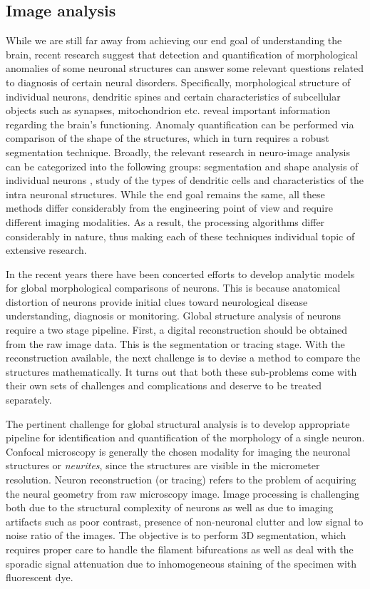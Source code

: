 \subsection{Image analysis}
While we are still far away from achieving our end goal of understanding the brain, recent research suggest that detection and quantification of morphological anomalies of some neuronal structures can answer some relevant questions related to diagnosis of certain neural disorders. Specifically, morphological structure of individual neurons, dendritic spines and certain characteristics of subcellular objects such as synapses, mitochondrion etc. reveal important information regarding the brain’s functioning. Anomaly quantification can be performed via comparison of the shape of the structures, which in turn requires a robust segmentation technique. Broadly, the relevant research in neuro-image analysis can be categorized into the following groups: segmentation and shape analysis of individual neurons \cite{dima_wavalet,mukherjee_T2T_2,mukherjee_TuFF,rodriguez_voxelscoop,peng_GAD}, study of the types of dendritic cells and characteristics of the intra neuronal structures\cite{5613939,6008641,6971126,EMmembrane_nguyen}. While the end goal remains the same, all these methods differ considerably from the engineering point of view and require different imaging modalities. As a result, the processing algorithms differ considerably in nature, thus making each of these techniques individual topic of extensive research.

In the recent years there have been concerted efforts to develop analytic models for global morphological comparisons of neurons. This is because anatomical distortion of neurons provide initial clues toward neurological disease understanding, diagnosis or  monitoring. Global structure analysis of neurons require a two stage pipeline. First, a digital reconstruction should be obtained from the raw image data. This is the segmentation or tracing stage. With the reconstruction available, the next challenge is to devise a method to compare the structures mathematically. It turns out that both these sub-problems come with their own sets of challenges and complications and deserve to be treated separately. 

The pertinent challenge for global structural analysis is to develop appropriate pipeline for identification and quantification of the morphology of a single neuron. Confocal microscopy is generally the chosen modality for imaging the neuronal structures or \textit{neurites}, since the structures are visible in the micrometer resolution. Neuron reconstruction (or tracing) refers to the problem of acquiring the neural geometry from raw microscopy image.  Image processing is challenging both due to the structural complexity of neurons as well as due to imaging artifacts such as poor contrast, presence of non-neuronal clutter and low signal to noise ratio of the images. The objective is to perform 3D segmentation, which requires proper care to handle the filament bifurcations as well as deal with the sporadic signal attenuation due to inhomogeneous staining of the specimen with fluorescent dye. 

